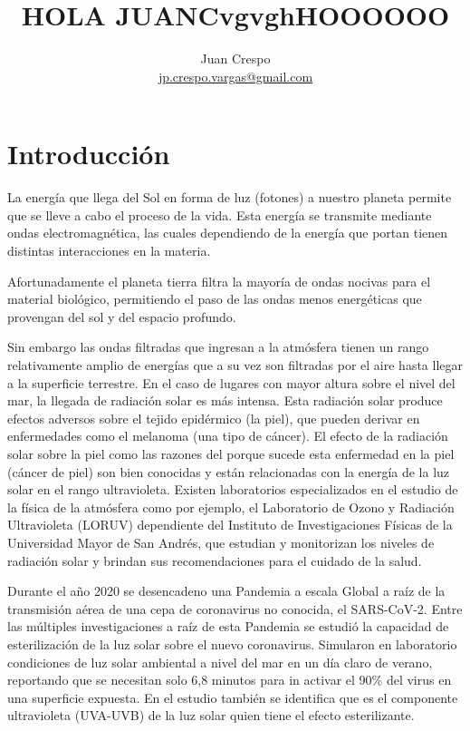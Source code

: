 \documentclass[letterpaper,11pt]{article}
\title{HOLA JUANCvgvghHOOOOOO}
\author{Juan Crespo  \\  \url{jp.crespo.vargas@gmail.com}}
\date{} %
\begin{document}
\maketitle


\begin{abstract}
  
\end{abstract}
  
\section{Introducción}
\label{sec:intro}
La energía que llega del Sol en forma de luz (fotones) a nuestro planeta permite que se lleve a cabo el proceso de la vida. Esta energía se transmite mediante ondas electromagnética, las cuales dependiendo de la energía que portan tienen distintas interacciones en la materia. 

Afortunadamente el planeta tierra filtra la mayoría de ondas nocivas para el material biológico, permitiendo el paso de las ondas menos energéticas que provengan del sol y del espacio profundo.

Sin embargo las ondas filtradas que ingresan a la atmósfera tienen un rango relativamente amplio de energías que a su vez son filtradas por el aire hasta llegar a la superficie terrestre. En el caso de lugares con mayor altura sobre el nivel del mar, la llegada de radiación solar es más intensa. Esta radiación solar produce efectos adversos sobre el tejido epidérmico (la piel), que pueden derivar en enfermedades como el melanoma (una tipo de cáncer). El efecto de la radiación solar sobre la piel como las razones del porque sucede esta enfermedad en la piel (cáncer de piel) son bien conocidas y están relacionadas con la energía de la luz solar en el rango ultravioleta. Existen laboratorios especializados en el estudio de la física de la atmósfera como por ejemplo, el Laboratorio de Ozono y Radiación Ultravioleta (LORUV) dependiente del Instituto de Investigaciones Físicas de la Universidad Mayor de San Andrés, que estudian y monitorizan los niveles de radiación solar y brindan sus recomendaciones para el cuidado de la salud. 

Durante el año 2020 se desencadeno una Pandemia a escala Global a raíz de la transmisión aérea de una cepa de coronavirus no conocida, el SARS-CoV-2. Entre las múltiples investigaciones a raíz de esta Pandemia se estudió la capacidad de esterilización de la luz solar \cite{covidsol} sobre el nuevo coronavirus. Simularon en laboratorio condiciones de luz solar ambiental a nivel del mar en un día claro de verano, reportando que se necesitan solo 6,8 minutos para in activar el 90\% del virus en una superficie expuesta. En el estudio también se identifica que es el componente ultravioleta (UVA-UVB) de la luz solar quien tiene el efecto esterilizante. 
\end{document}
